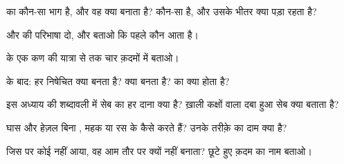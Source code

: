 \begin{exercise}[$\star$]\label{exo:g5:flower-to-fruit:1}
 का कौन-सा भाग  है, और वह क्या बनाता है? कौन-सा  है, और उसके
भीतर क्या पड़ा रहता है?
\end{exercise}

\begin{exercise}[$\star$]\label{exo:g5:flower-to-fruit:2}
 और  की परिभाषा दो, और बताओ कि पहले कौन आता है।
\end{exercise}

\begin{exercise}[$\star$]\label{exo:g5:flower-to-fruit:3}
 के एक कण की यात्रा  से  तक चार क़दमों में बताओ।
\end{exercise}

\begin{exercise}[$\star$]\label{exo:g5:flower-to-fruit:4}
 के बाद: हर निषेचित  क्या बनता है?  क्या बनता
है?  का क्या होता है?
\end{exercise}

\begin{exercise}[$\star$]\label{exo:g5:flower-to-fruit:5}
इस अध्याय की शब्दावली में सेब का हर दाना क्या है? ख़ाली कक्षों वाला
दबा हुआ सेब क्या बताता है?
\end{exercise}

\begin{exercise}[$\star$]\label{exo:g5:flower-to-fruit:6}
घास और हेज़ल बिना , महक या रस के  कैसे करते हैं? उनके
तरीक़े का दाम क्या है?
\end{exercise}

\begin{exercise}[$\star$]\label{exo:g5:flower-to-fruit:7}
जिस  पर कोई  नहीं आया, वह आम तौर पर  क्यों नहीं बनाता? छूटे
हुए क़दम का नाम बताओ।
\end{exercise}

